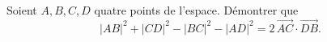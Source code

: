 Soient $A, B, C, D$ quatre points de l'espace. Démontrer que
\[
|AB|^2 + |CD|^2 - |BC|^2 - |AD|^2 = 2\,\overrightarrow{AC} \cdot \overrightarrow{DB}.
\]
